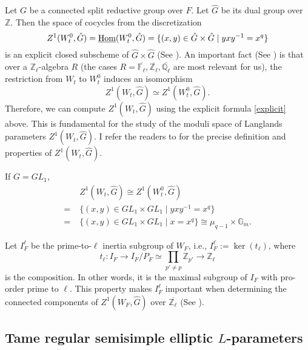 	Let $G$ be a connected split reductive group over $F$. Let $\hat{G}$ be its dual group over $\mathbb{Z}$. Then the space of cocycles from the discretization
	\begin{equation}\label{Equation space of tame cocycle}
		Z^1(W_t^0, \hat{G})=\underline{\operatorname{\operatorname{Hom}}}(W_t^0, \hat{G})=\{(x, y) \in \hat{G} \times \hat{G}\;|\;yxy^{-1}=x^q\}
	\end{equation}
	is an explicit closed subscheme of $\hat{G} \times \hat{G}$ (See \cite[Section 3]{dat2022ihes}). An important fact (See \cite[Proposition 3.9]{dat2022ihes}) is that over a $\mathbb{Z}_{\ell}$-algebra $R$ (the cases $R=\overline{\mathbb{F}_{\ell}}, \overline{\mathbb{Z}_{\ell}}, \overline{\mathbb{Q}_{\ell}}$ are most relevant for us), the restriction from $W_t$ to $W_t^0$ induces an isomorphism
	$$Z^1(W_t, \hat{G}) \simeq Z^1(W_t^0, \hat{G}).$$ 
	Therefore, we can compute $Z^1(W_t, \hat{G})$ using the explicit formula \eqref{explicit} above. This is fundamental for the study of the moduli space of Langlands parameters $Z^1(W_t, \hat{G})$. I refer the readers to \cite[Section 3 and Section 4]{dat2022ihes} for the precise definition and properties of $Z^1(W_t, \hat{G})$. 
	
	\begin{eg}\label{Example GL_1}
		If $G=GL_1$,
	  \begin{equation*}
	  \begin{aligned}
		&Z^1(W_t, \hat{G}) \cong Z^1(W_t^0, \hat{G})\\
		=\;&\{(x, y) \in GL_1 \times GL_1\;|\;yxy^{-1}=x^q\}\\
		=\;&\{(x, y) \in GL_1 \times GL_1\;|\;x=x^q\} \cong \mu_{q-1} \times \mathbb{G}_m.
	  \end{aligned}
      \end{equation*}
	\end{eg}
	
	Let $I_F^{\ell}$ be the prime-to-$\ell$ inertia subgroup of $W_F$, i.e., $I_F^{\ell}:=\ker(t_{\ell})$, where 
	$$t_\ell: I_F \to I_F/P_F \simeq \prod_{p' \neq p}\mathbb{Z}_{p'} \to \mathbb{Z}_\ell$$
	is the composition. In other words, it is the maximal subgroup of $I_F$ with pro-order prime to $\ell$. This property makes $I_F^{\ell}$ important when determining the connected components of $Z^1(W_F, \hat{G})$ over $\overline{\mathbb{Z}_{\ell}}$ (See \cite[Theorem 4.2 and Subsection 4.6]{dat2022ihes}). 
	
	\subsection{Tame regular semisimple elliptic $L$-parameters}\label{Subsection TRSELP}
	
